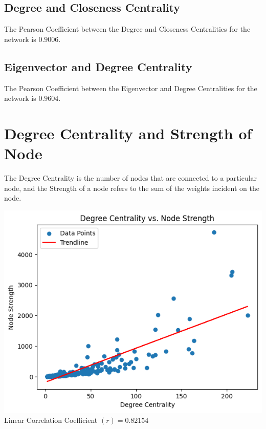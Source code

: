 \documentclass[11pt]{article}
\begin{document}
\subsection{Degree and Closeness Centrality}
The Pearson Coefficient between the Degree and Closeness Centralities for the network is $0.9006$.
\subsection{Eigenvector and Degree Centrality}
The Pearson Coefficient between the Eigenvector and Degree Centralities for the network is $0.9604$.
\section{Degree Centrality and Strength of Node}
The Degree Centrality is the number of nodes that are connected to a particular node, and the Strength of a node refers to the sum of the weights incident on the node.
\begin{center}
    \includegraphics[scale=0.5]{degcent.png}\\
    Linear Correlation Coefficient $(r) = 0.82154$ 
\end{center}
\end{document}
